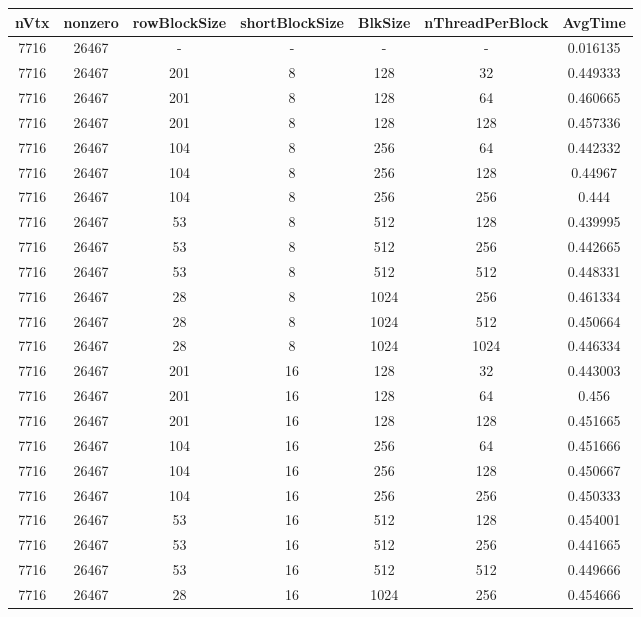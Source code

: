 \documentclass[9pt]{article}
\begin{document}
\SetBgPosition{0.25cm,-5.0cm}
\begin{tabular}{|c|c|c|c|c|c|c| }  
\hline
nVtx  & nonzero  & rowBlockSize  & shortBlockSize  & BlkSize  & nThreadPerBlock  & AvgTime \\
\hline
7716  & 26467  &  -  & -  & -  & -  &0.016135 \\
\hline
7716  & 26467  & 201  & 8  & 128  & 32  & 0.449333 \\
\hline
7716  & 26467  & 201  & 8  & 128  & 64  & 0.460665 \\
\hline
7716  & 26467  & 201  & 8  & 128  & 128  & 0.457336 \\
\hline
7716  & 26467  & 104  & 8  & 256  & 64  & 0.442332 \\
\hline
7716  & 26467  & 104  & 8  & 256  & 128  & 0.44967 \\
\hline
7716  & 26467  & 104  & 8  & 256  & 256  & 0.444 \\
\hline
7716  & 26467  & 53  & 8  & 512  & 128  & 0.439995 \\
\hline
7716  & 26467  & 53  & 8  & 512  & 256  & 0.442665 \\
\hline
7716  & 26467  & 53  & 8  & 512  & 512  & 0.448331 \\
\hline
7716  & 26467  & 28  & 8  & 1024  & 256  & 0.461334 \\
\hline
7716  & 26467  & 28  & 8  & 1024  & 512  & 0.450664 \\
\hline
7716  & 26467  & 28  & 8  & 1024  & 1024  & 0.446334 \\
\hline
7716  & 26467  & 201  & 16  & 128  & 32  & 0.443003 \\
\hline
7716  & 26467  & 201  & 16  & 128  & 64  & 0.456 \\
\hline
7716  & 26467  & 201  & 16  & 128  & 128  & 0.451665 \\
\hline
7716  & 26467  & 104  & 16  & 256  & 64  & 0.451666 \\
\hline
7716  & 26467  & 104  & 16  & 256  & 128  & 0.450667 \\
\hline
7716  & 26467  & 104  & 16  & 256  & 256  & 0.450333 \\
\hline
7716  & 26467  & 53  & 16  & 512  & 128  & 0.454001 \\
\hline
7716  & 26467  & 53  & 16  & 512  & 256  & 0.441665 \\
\hline
7716  & 26467  & 53  & 16  & 512  & 512  & 0.449666 \\
\hline
7716  & 26467  & 28  & 16  & 1024  & 256  & 0.454666 \\

\end{tabular}
\end{document}
